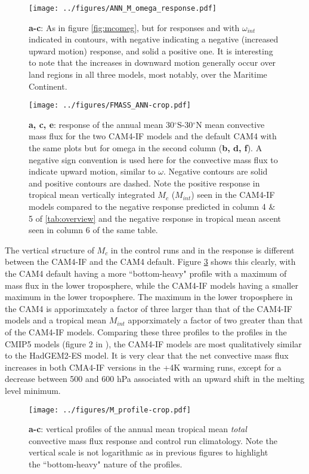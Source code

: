 \documentclass[letterpaper,12pt,titlepage,oneside,final]{book}
\begin{document}
\begin{figure}[H]
\centering
\noindent\texttt{[image: ../figures/ANN\_M\_omega\_response.pdf]}\hfill
\caption{\textbf{a-c}: As in figure \ref{fig:mcomeg}, but for responses and with $\omega_{int}$ indicated in contours, with negative indicating a negative (increased upward motion) response, and solid a positive one. It is interesting to note that the increases in downward motion generally occur over land regions in all three models, most notably, over the Maritime Continent.}
\label{fig:mcomegres}
\end{figure}
\begin{figure}[H]
\centering
\noindent\texttt{[image: ../figures/FMASS\_ANN-crop.pdf]}\hfill
\caption{\textbf{a, c, e}: response of the annual mean 30$^\circ$S-30$^\circ$N mean convective mass flux for the two CAM4-IF models and the default CAM4 with the same plots but for omega in the second column (\textbf{b, d, f}). A negative sign convention is used here for the convective mass flux to indicate upward motion, similar to $\omega$. Negative contours are solid and positive contours are dashed. Note the positive response in tropical mean vertically integrated $M_c$ ($M_{int}$) seen in the CAM4-IF models compared to the negative response predicted in column 4 \& 5 of \ref{tab:overview} and the negative response in tropical mean ascent seen in column 6 of the same table. }
\label{fig:Mc}
\end{figure}
The vertical structure of $M_{c}$ in the control runs and in the response is different between the CAM4-IF and the CAM4 default. Figure \ref{fig:mprofs} shows this clearly, with the CAM4 default having a more ``bottom-heavy" profile with a maximum of mass flux in the lower troposphere, while the CAM4-IF models having a smaller maximum in the lower troposphere. The maximum in the lower troposphere in the CAM4 is apporimxately a factor of three larger than that of the CAM4-IF models and a tropical mean $M_{int}$ apporximately a factor of two greater than that of the CAM4-IF models. Comparing these three profiles to the profiles in the CMIP5 models (figure 2 in \cite{chadwick_spatial_2012}), the CAM4-IF models are most qualitatively similar to the HadGEM2-ES model. It is very clear that the net convective mass flux increases in both CMA4-IF versions in the +4K warming runs, except for a decrease between 500 and 600 hPa associated with an upward shift in the melting level minimum.
\begin{figure}[H]
\centering
\noindent\texttt{[image: ../figures/M\_profile-crop.pdf]}\hfill
\caption{\textbf{a-c}: vertical profiles of the annual mean tropical mean \textit{total} convective mass flux response and control run climatology. Note the vertical scale is not logarithmic as in previous figures to highlight the ``bottom-heavy" nature of the profiles.}
\label{fig:mprofs}
\end{figure}
\end{document}
